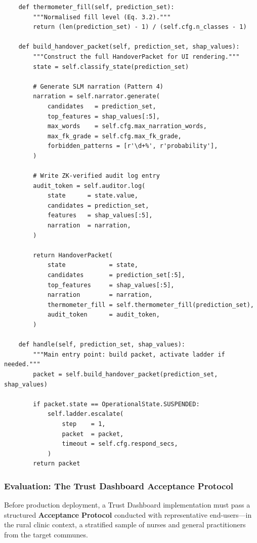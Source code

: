 \begin{lstlisting}
    def thermometer_fill(self, prediction_set):
        """Normalised fill level (Eq. 3.2)."""
        return (len(prediction_set) - 1) / (self.cfg.n_classes - 1)

    def build_handover_packet(self, prediction_set, shap_values):
        """Construct the full HandoverPacket for UI rendering."""
        state = self.classify_state(prediction_set)

        # Generate SLM narration (Pattern 4)
        narration = self.narrator.generate(
            candidates   = prediction_set,
            top_features = shap_values[:5],
            max_words    = self.cfg.max_narration_words,
            max_fk_grade = self.cfg.max_fk_grade,
            forbidden_patterns = [r'\d+%', r'probability'],
        )

        # Write ZK-verified audit log entry
        audit_token = self.auditor.log(
            state      = state.value,
            candidates = prediction_set,
            features   = shap_values[:5],
            narration  = narration,
        )

        return HandoverPacket(
            state            = state,
            candidates       = prediction_set[:5],
            top_features     = shap_values[:5],
            narration        = narration,
            thermometer_fill = self.thermometer_fill(prediction_set),
            audit_token      = audit_token,
        )

    def handle(self, prediction_set, shap_values):
        """Main entry point: build packet, activate ladder if needed."""
        packet = self.build_handover_packet(prediction_set, shap_values)

        if packet.state == OperationalState.SUSPENDED:
            self.ladder.escalate(
                step    = 1,
                packet  = packet,
                timeout = self.cfg.respond_secs,
            )
        return packet
\end{lstlisting}

\subsubsection{Evaluation: The Trust Dashboard Acceptance Protocol}
\label{subsubsec:dashboard-evaluation}

Before production deployment, a Trust Dashboard implementation
must pass a structured \textbf{Acceptance Protocol} conducted
with representative end-users---in the rural clinic context, a
stratified sample of nurses and general practitioners from the
target communes.

